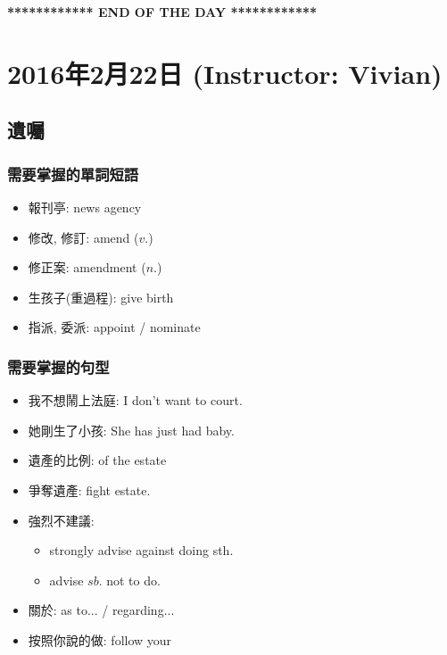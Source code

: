 \vspace{15mm}

\begin{center}
  \textbf{************ END OF THE DAY ************}
\end{center}
\newpage

\section{2016年2月22日 (Instructor: Vivian)}
\subsection{遺囑}
\subsubsection*{需要掌握的單詞短語}
\begin{multicols}{3}
\begin{itemize}
  \itemsep0em
  \item 報刊亭: news agency
  \item 修改, 修訂: amend ($v.$)
  \item 修正案: amendment ($n.$)
  \item 生孩子(重過程): give birth
  \item 指派, 委派: appoint / nominate
\end{itemize}
\end{multicols}

\subsubsection*{需要掌握的句型}
\begin{multicols}{2}
\begin{itemize}
  \itemsep0em
  \item 我不想鬧上法庭: I don't want to  court.
  \item 她剛生了小孩: She has just had baby.
  \item 遺產的比例:  of the estate
  \item 爭奪遺產: fight  estate.
  \item 強烈不建議:
  \begin{itemize}
    \itemsep0em
    \item strongly advise against doing sth.
    \item advise $sb.$ not to do.
\end{itemize}
  \item 關於: as to... / regarding...
  \item 按照你說的做: follow your 
\end{itemize}
\end{multicols}

